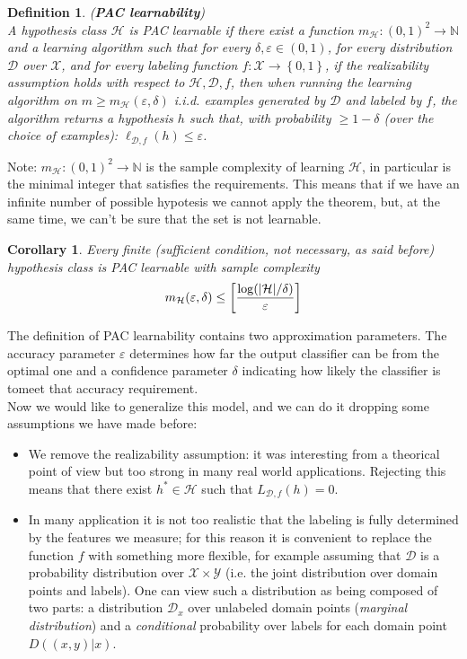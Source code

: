 \documentclass[12pt]{report}
\theoremstyle{plain}
\newtheorem{definition}{Definition}[chapter]
\newtheorem{corollary}{Corollary}[theorem]
\newcommand\mcl[1]{\mathcal{#1}}
\begin{document}
\begin{flushleft}
\begin{definition}
(\textbf{PAC learnability})\\
A hypothesis class $\mcl{H}$ is PAC learnable if there exist a function $m_\mcl{H}:(0,1)^2\to\mathds{N}$ and a learning algorithm such that for every $\delta,\varepsilon\in(0,1)$, for every distribution $\mcl{D}$ over $\mcl{X}$, and for every labeling function $f:\mcl{X}\to\left\{0,1\right\}$, if the realizability assumption holds with respect to $\mcl{H},\mcl{D},f$, then when running the learning algorithm on $m\geq m_\mcl{H}(\varepsilon,\delta)$ i.i.d. examples generated by $\mcl{D}$ and labeled by $f$, the algorithm returns a hypothesis $h$ such that, with probability $\geq 1-\delta$ (over the choice of examples): $\ell_{\mcl{D},f}(h)\leq\varepsilon$.
\label{def:PAC_learn}
\end{definition}

Note: $m_\mcl{H}:(0,1)^2\to\mathds{N}$ is the sample complexity of learning $\mcl{H}$, in particular is the minimal integer that satisfies the requirements. This means that if we have an infinite number of possible hypotesis we cannot apply the theorem, but, at the same time, we can't be sure that the set is not learnable.\\

\begin{corollary}
Every finite (sufficient condition, not necessary, as said before) hypothesis class is PAC learnable with sample complexity
\[ m_\mcl{H}(\varepsilon,\delta)\leq\left[ \frac{\log(\abs{\mcl{H}}/\delta)}{\varepsilon} \right] \]
\end{corollary}

The definition of PAC learnability contains two approximation parameters. The accuracy parameter $\varepsilon$
 determines how far the output classifier can be from the optimal one and a confidence parameter $\delta$ indicating how likely the classifier is tomeet that accuracy requirement.\\

\vspace{0.5cm}
Now we would like to generalize this model, and we can do it dropping some assumptions we have made before:
\begin{itemize}
\item We remove the realizability assumption: it was interesting from a theorical point of view but too strong in many real world applications. Rejecting this means that there exist $h^*\in\mcl{H}$ such that $L_{\mcl{D},f}(h)=0$.
\item In many application it is not too realistic that the labeling is fully determined by the features we measure; for this reason it is convenient to replace the function $f$ with something more flexible, for example assuming that $\mcl{D}$ is a probability distribution over $\mcl{X}\times\mcl{Y}$ (i.e. the joint distribution over domain points and labels). One can view such a distribution as being composed of two parts: a distribution $\mcl{D}_x$ over unlabeled domain points (\textit{marginal distribution}) and a \textit{conditional} probability over labels for each domain point $D((x,y)|x)$.
\end{itemize}


\end{flushleft}
\end{document}
